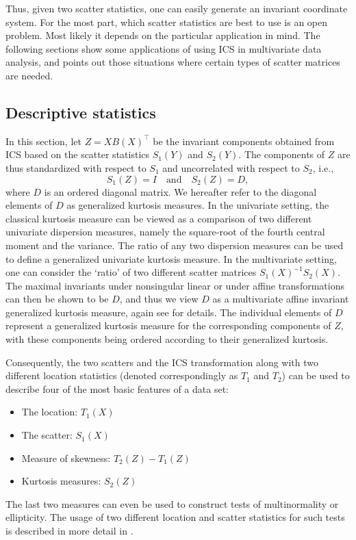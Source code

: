 \documentclass[article,nojss]{jss}
\begin{document}
Thus, given two scatter statistics, one can easily generate an invariant coordinate system. For the most part, which
scatter statistics are best to use is an open problem. Most likely it depends on the particular application in mind.
The following sections show some applications of using {ICS} in multivariate data analysis, and points out those
situations where certain types of scatter matrices are needed.

\subsection{Descriptive statistics}\label{MADdes}

In this section, let $Z=X B(X)^\top$ be the invariant components obtained from {ICS} based on the scatter
statistics $S_1(Y)$ and $S_2(Y)$. The components of $Z$ are thus standardized with respect to $S_1$ and uncorrelated
 with respect to $S_2$, i.e.,
\[
S_1(Z)=I \quad \mbox{and} \quad S_2(Z)=D,
\]
where $D$ is an ordered diagonal matrix. We hereafter refer to the diagonal elements of $D$ as generalized kurtosis measures.
In the univariate setting, the classical kurtosis measure can be viewed as a comparison of two different univariate dispersion
measures, namely the square-root of the fourth central moment and the variance. The ratio of any two dispersion measures
can be used to define a generalized univariate kurtosis measure.  In the multivariate setting, one can
consider the `ratio' of two different scatter matrices $S_1(X)^{-1}S_2(X)$. The maximal invariants under nonsingular linear or
under affine transformations can then be shown to be $D$, and thus we view $D$ as a multivariate affine invariant generalized
kurtosis measure, again see \citet{Tyler2008} for details. The individual elements of $D$ represent a generalized kurtosis
measure for the corresponding components of $Z$, with these components being ordered according to their generalized kurtosis.

Consequently, the two scatters and the {ICS} transformation along with two different location statistics
(denoted correspondingly as $T_1$ and $T_2$) can be used to describe four of the most basic features of a data set:
\begin{itemize}
  \item The location: $T_1(X)$
  \item The scatter: $S_1(X)$
  \item Measure of skewness: $T_2(Z)-T_1(Z)$
  \item Kurtosis measures: $S_2(Z)$
\end{itemize}
The last two measures can even be used to construct tests of multinormality or ellipticity.
The usage of two different location and scatter statistics for such tests is described in
more detail in \citet{KankainenTaskinenOja2007}.
\end{document}
